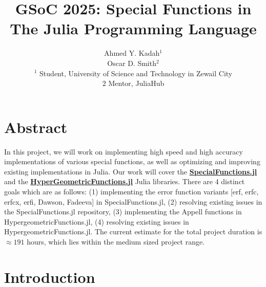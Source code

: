 \documentclass{article}
\title{GSoC 2025: Special Functions in The Julia Programming Language}
\author{Ahmed Y. Kadah$^1$  
\\Oscar D. Smith$^2$ 
\\$^1$ Student, University of Science and Technology in Zewail City
\\ $2$ Mentor, JuliaHub}
\date{}
\theoremstyle{mytheoremstyle}
\theoremstyle{mytheoremstyle}
\theoremstyle{myproblemstyle}
\begin{document}
    \maketitle


  \section*{Abstract}
    In this project, we will work on implementing high speed and high accuracy implementations of various special functions, as well as optimizing and improving existing implementations in Julia.
    Our work will cover the \href{https://github.com/JuliaMath/SpecialFunctions.jl}{\textbf{SpecialFunctions.jl}} and the \href{https://github.com/JuliaMath/HypergeometricFunctions.jl/issues}{\textbf{HyperGeometricFunctions.jl}} Julia libraries. There are 4 distinct goals which are as follows: (1) implementing the error function variants [erf, erfc, erfcx, erfi, Dawson, Fadeeva] in SpecialFunctions.jl, (2) resolving existing issues in the SpecialFunctions.jl repository, (3) implementing the Appell functions in HypergeometricFunctions.jl, (4) resolving existing issues in HypergeometricFunctions.jl. 
    The current estimate for the total project duration is $\approx 191 $ hours, which lies within the medium sized project range. 

  \section*{Introduction}
\end{document}
